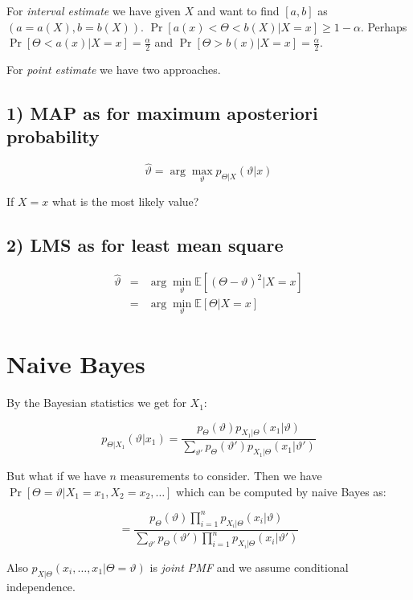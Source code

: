 For \textit{interval estimate} we have given $X$ and want to find $[a,b]$ as $(a = a(X), b = b(X))$. $\Pr[a(x) < \Theta < b(X) \vert X = x] \geq 1 - \alpha$. Perhaps $\Pr[\Theta < a(x) \vert X =x ] = \frac{\alpha}{2}$ and $\Pr[\Theta > b(x) \vert X =x ] = \frac{\alpha}{2}$.

For \textit{point estimate} we have two approaches.

\subsection{1) MAP as for maximum aposteriori probability}

$$
\hat{\vartheta} = \arg\max_{\vartheta} p_{\Theta \vert X} (\vartheta \vert x)
$$

If $X = x$ what is the most likely value?

\subsection{2) LMS as for least mean square}

$$
\begin{array}{rcl}
\hat{\vartheta} & = & \arg\min_{\vartheta} \mathbb{E}[(\Theta - \vartheta)^{2} \vert X = x] \\
& = & \arg\min_{\vartheta} \mathbb{E}[\Theta \vert X = x]
\end{array}
$$

\section{Naive Bayes}

By the Bayesian statistics we get for $X_{1}$:

$$
p_{\Theta\vert X_{1}} (\vartheta \vert x_{1}) = \frac{p_{\Theta}(\vartheta) p_{X_{1} \vert\Theta}(x_{1} \vert \vartheta)}{\sum_{\vartheta'} p_{\Theta}(\vartheta')p_{X_{1}\vert\Theta}(x_{1} \vert \vartheta')}
$$

But what if we have $n$ measurements to consider. Then we have $\Pr[\Theta = \vartheta \vert X_{1} = x_{1}, X_{2} = x_{2}, \dots]$ which can be computed by naive Bayes as:

$$
= \frac{p_{\Theta}(\vartheta) \prod_{i=1}^{n}p_{X_{i}\vert \Theta} (x_{i} \vert \vartheta)}{\sum_{\vartheta'} p_{\Theta}(\vartheta')\prod_{i=1}^{n}p_{X_{i}\vert \Theta} (x_{i} \vert \vartheta')}
$$

Also $p_{X \vert \Theta}(x_{i}, \dots, x_{1} \vert \Theta = \vartheta)$ is \textit{joint PMF} and we assume conditional independence.

